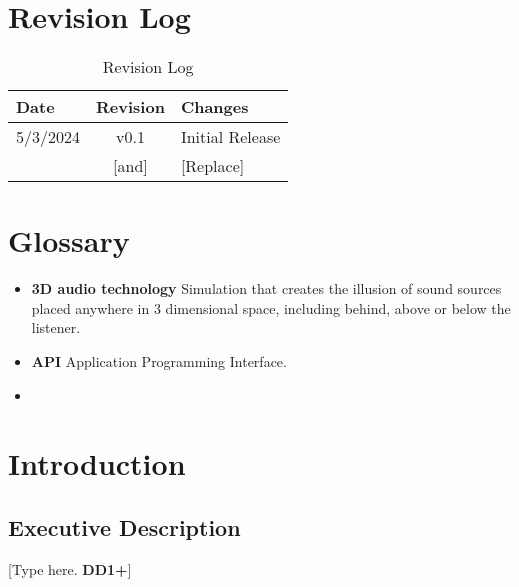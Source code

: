 \documentclass[letterpaper, 11pt]{article}
\begin{document}
\clearpage
\listoffigures %

\clearpage
\listoftables %

\clearpage
\section*{Revision Log}
\begin{table}[h]
    \begin{tabularx}{\textwidth}{|l|c|X|} %
    \hline
    Date     & Revision &  Changes \\ \hline
    5/3/2024 & v0.1     &  Initial Release    \\ \hline
    [Copy]   & [and]    &  [Replace]    \\ \hline
    \end{tabularx}
    \caption{Revision Log}
\end{table} 

\clearpage
\section*{Glossary} %
\begin{itemize} %
    \item \textbf{3D audio technology} Simulation that creates the illusion of sound sources placed anywhere in 3 dimensional space, including behind, above or below the listener.
    \item \textbf{API} Application Programming Interface.
    \item 
\end{itemize}

\clearpage
\section{Introduction}
\subsection{Executive Description}
[Type here. \textbf{DD1+}]
\end{document}
